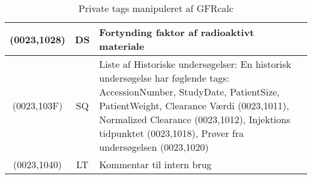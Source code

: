 \documentclass{article}
\begin{document}
\begin{table}[h]
\begin{center}
\begin{tabular}{|c|c|p{7cm}|}
		(0023,1028) & DS & Fortynding faktor af radioaktivt materiale \\ \hline
		(0023,103F) & SQ & Liste af Historiske undersøgelser: En historisk undersøgelse har føglende tags: AccessionNumber, StudyDate, PatientSize, PatientWeight, Clearance Værdi (0023,1011), Normalized Clearance (0023,1012),  Injektions tidpunktet (0023,1018), Prøver fra undersøgelsen (0023,1020) \\ \hline
		(0023,1040) & LT & Kommentar til intern brug  \\ \hline
		\end{tabular}
	\end{center}	
	\caption{Private tags manipuleret af GFRcalc}
\end{table}
\end{document}
